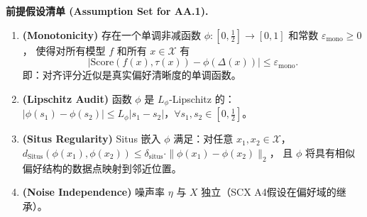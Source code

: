 \documentclass[12pt,a4paper]{article}
\newcommand{\cX}{\mathcal{X}}
\newcommand{\Situs}{\mathrm{Situs}}
\begin{document}
\medskip\noindent
\textbf{前提假设清单 (Assumption Set for AA.1).}
\begin{enumerate}[label=AA.1.\arabic*:,ref=AA.1.\arabic*]
    \item \textbf{(Monotonicity)}\label{ass:mono-formal}
          存在一个单调非减函数 $\phi:[0,\frac12]\to[0,1]$ 和常数 $\varepsilon_{\mathrm{mono}} \geq 0$，
          使得对所有模型 $f$ 和所有 $x\in\cX$ 有
          \[
          \bigl| \mathrm{Score}(f(x),\tau(x)) - \phi(\Delta(x)) \bigr| \leq \varepsilon_{\mathrm{mono}}.
          \]
          即：对齐评分近似是真实偏好清晰度的单调函数。
    \item \textbf{(Lipschitz Audit)} \label{ass:lipschitz}
          函数 $\phi$ 是 $L_\phi$-Lipschitz 的：
          $|\phi(s_1)-\phi(s_2)| \leq L_\phi |s_1-s_2|$，$\forall s_1,s_2\in[0,\frac12]$。
    \item \textbf{(Situs Regularity)} \label{ass:situs-reg}
          Situs 嵌入 $\phi$ 满足：对任意 $x_1,x_2\in\cX$，
          $d_{\Situs}(\phi(x_1),\phi(x_2)) \leq \delta_{\mathrm{situs}} \cdot \|\phi(x_1)-\phi(x_2)\|_2$，
          且 $\phi$ 将具有相似偏好结构的数据点映射到邻近位置。
    \item \textbf{(Noise Independence)} \label{ass:noise-indep}
          噪声率 $\eta$ 与 $X$ 独立（SCX A4假设在偏好域的继承）。
\end{enumerate}
\end{document}
